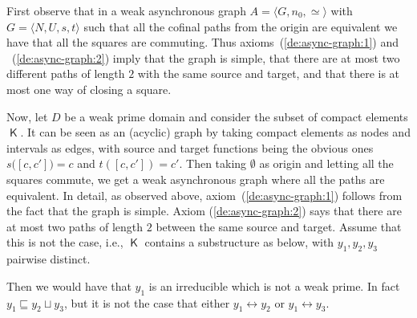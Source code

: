 \documentclass[conference]{IEEEtran}
\renewenvironment{proof}{\begin{IEEEproof}}{\end{IEEEproof}}
\newcommand{\compact}[1]{\ensuremath{\mathop{\mathsf{K}({#1})}}}
\newcommand{\dint}[2]{\ensuremath{[{#1},{#2}]}}
\begin{document}
\begin{proof}
  First observe that in a weak asynchronous graph
  $A = \langle G, n_0, \simeq \rangle$ with
  $G = \langle N, U, s, t \rangle$ such that all the {cofinal} paths from the
  origin are equivalent we have that all the squares are commuting. Thus
  axioms~(\ref{de:async-graph:1}) and ~(\ref{de:async-graph:2}) imply that the graph
  is simple, that there are at most two different paths of length $2$ with
  the same source and target, and that there is at most one way of
  closing a square.
  

  
  Now, let $D$ be a weak prime domain and consider the subset of compact
  elements $\compact{D}$. It can be seen as an (acyclic) graph by taking compact
  elements as nodes and intervals as edges, with source and target
  functions being the obvious ones $s(\dint{c}{c'}{)} = c$ and
  $t(\dint{c}{c'}) = c'$.
  Then taking $\emptyset$ as origin and letting all the squares commute,
  we get a weak asynchronous graph where all the paths are equivalent.
  In detail, as observed above, axiom~(\ref{de:async-graph:1}) follows
  from the fact that the graph is simple. 
  Axiom (\ref{de:async-graph:2}) says that there are at most two
  paths of length $2$ between the same source and target. Assume that this
  is not the case, i.e., $\compact{D}$ contains a substructure as below, with $y_1, y_2, y_3$ pairwise distinct.
  \begin{center}
  \end{center}
  Then we would have that $y_1$ is an irreducible which is not a weak
  prime. In fact $y_1 \sqsubseteq y_2 \sqcup y_3$, but it is not the
  case that either $y_1 \leftrightarrow y_2$ or $y_1 \leftrightarrow y_3$.


\end{proof}
\end{document}
